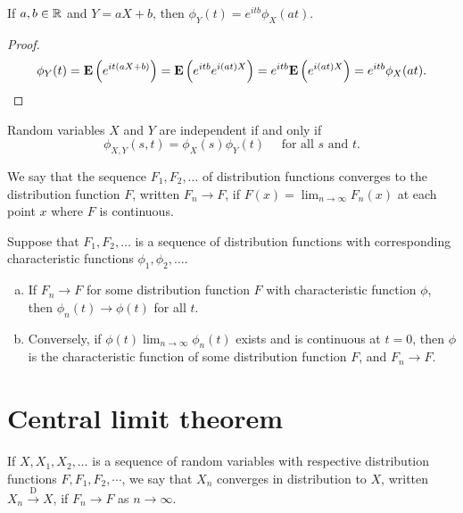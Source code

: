 \begin{theorem}
If $a, b \in \mathbb{R}$ and $Y = aX+b$, then $\phi_{Y}(t)=e^{i t b} \phi_{X}(a t)$.
\end{theorem}
\begin{proof}
\begin{equation*}
    \phi_{Y}(t)=\mathbf{E}\left(e^{i t(a X+b)}\right)=\mathbf{E}\left(e^{i t b} e^{i(a t) X}\right) = e^{i t b} \mathbf{E}\left(e^{i(a t) X}\right)=e^{i t b} \phi_{X}(a t).
\end{equation*}
\end{proof}

\begin{theorem}
Random variables $X$ and $Y$ are independent if and only if
\begin{equation*}
    \phi_{X, Y}(s, t)=\phi_{X}(s) \phi_{Y}(t) \quad \text { for all } s \text { and } t.
\end{equation*}
\end{theorem}

\begin{definition}
We say that the sequence $F_1 , F_2, \dots $ of distribution functions converges to the distribution function $F$, written $F_n \to F$, if $F(x) = \lim_{n\to\infty} F_n(x)$ at each point $x$ where $F$ is continuous.
\end{definition}

\begin{theorem}
Suppose that $F_1 , F_2, \dots $ is a sequence of distribution functions 
with corresponding characteristic functions $\phi_1 , \phi_2, \dots $.
\begin{enumerate}[(a)]
    \item If $F_n \to F$ for some distribution function $F$ with characteristic function $\phi$, then $\phi_n(t) \to \phi(t)$ for all $t$.
    \item Conversely, if $\phi(t) \lim_{n\to\infty} \phi_n(t)$ exists and is continuous at $t=0$, then $\phi$ is the characteristic function of some distribution function $F$, and $F_n \to F$.
\end{enumerate}
\end{theorem}


\section{Central limit theorem}
\begin{definition}
If $X, X_1 , X_2 , \dots$ is a sequence of random variables with respective distribution functions $F, F_1, F_2, \cdots$, we say that $X_n$ converges in distribution to $X$, written $X_{n} \stackrel{\mathrm{D}}{\rightarrow} X$, if $F_n \to F$ as $n \to\infty$.
\end{definition}

